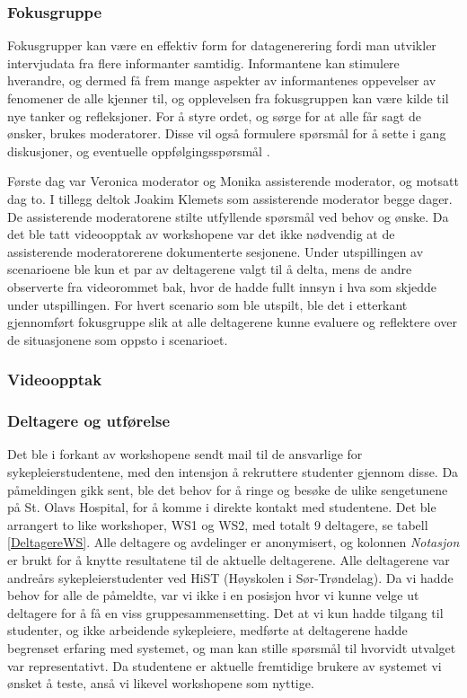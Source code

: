 \subsubsection{Fokusgruppe}
Fokusgrupper kan være en effektiv form for datagenerering fordi man utvikler intervjudata fra flere informanter samtidig. Informantene kan stimulere hverandre, og dermed få frem mange aspekter av informantenes oppevelser av fenomener de alle kjenner til, og opplevelsen fra fokusgruppen kan være kilde til nye tanker og refleksjoner. For å styre ordet, og sørge for at alle får sagt de ønsker, brukes moderatorer. Disse vil også formulere spørsmål for å sette i gang diskusjoner, og eventuelle oppfølgingsspørsmål \cite{Tjora}. 

\noindent
Første dag var Veronica moderator og Monika assisterende moderator, og motsatt dag to. I tillegg deltok Joakim Klemets som assisterende moderator begge dager. De assisterende moderatorene stilte utfyllende spørsmål ved behov og ønske. Da det ble tatt videoopptak av workshopene var det ikke nødvendig at de assisterende moderatorerene dokumenterte sesjonene. 
Under utspillingen av scenarioene ble kun et par av deltagerene valgt til å delta, mens de andre observerte fra videorommet bak, hvor de hadde fullt innsyn i hva som skjedde under utspillingen. For hvert scenario som ble utspilt, ble det i etterkant gjennomført fokusgruppe slik at alle deltagerene kunne evaluere og  reflektere over de situasjonene som oppsto i scenarioet.


\subsubsection{Videoopptak}
\subsubsection{Deltagere og utførelse}
Det ble i forkant av workshopene sendt mail til de ansvarlige for sykepleierstudentene, med den intensjon å rekruttere studenter gjennom disse. Da påmeldingen gikk sent, ble det behov for å ringe og besøke de ulike sengetunene på St. Olavs Hospital, for å komme i direkte kontakt med studentene. 
Det ble arrangert to like workshoper, WS1 og WS2, med totalt 9 deltagere, se tabell \ref{DeltagereWS}. Alle deltagere og avdelinger er anonymisert, og kolonnen \emph{Notasjon} er brukt for å knytte resultatene til de aktuelle deltagerene. Alle deltagerene var andreårs sykepleierstudenter ved HiST (Høyskolen i Sør-Trøndelag). Da vi hadde behov for alle de påmeldte, var vi ikke i en posisjon hvor vi kunne velge ut deltagere for å få en viss gruppesammensetting. Det at vi kun hadde tilgang til studenter, og ikke arbeidende sykepleiere, medførte at deltagerene hadde begrenset erfaring med systemet, og man kan stille spørsmål til hvorvidt utvalget var representativt. Da studentene er aktuelle fremtidige brukere av systemet vi ønsket å teste, anså vi likevel workshopene som nyttige.

